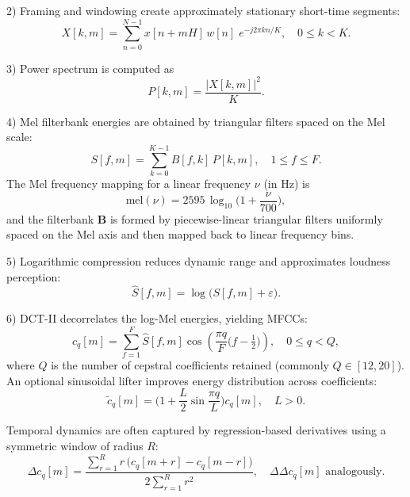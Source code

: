 2) Framing and windowing create approximately stationary short-time segments:
\begin{equation}\label{eq:stft}
X[k,m] = \sum_{n=0}^{N-1} x[n+mH]\, w[n] \; e^{-j 2\pi k n / K}, \quad 0 \le k < K.
\end{equation}

3) Power spectrum is computed as
\begin{equation}\label{eq:power}
P[k,m] = \frac{|X[k,m]|^2}{K}.
\end{equation}

4) Mel filterbank energies are obtained by triangular filters spaced on the Mel scale:
\begin{equation}\label{eq:mel}
S[f,m] = \sum_{k=0}^{K-1} B[f,k] \, P[k,m], \quad 1 \le f \le F.
\end{equation}
The Mel frequency mapping for a linear frequency \(\nu\) (in Hz) is
\begin{equation}\label{eq:mel-scale}
\mathrm{mel}(\nu) = 2595\, \log_{10}\!\bigg(1 + \frac{\nu}{700}\bigg),
\end{equation}
and the filterbank \(\mathbf{B}\) is formed by piecewise-linear triangular filters uniformly spaced on the Mel axis and then mapped back to linear frequency bins.

5) Logarithmic compression reduces dynamic range and approximates loudness perception:
\begin{equation}\label{eq:logmel}
\widehat{S}[f,m] = \log\big(S[f,m] + \varepsilon\big).
\end{equation}

6) DCT-II decorrelates the log-Mel energies, yielding MFCCs:
\begin{equation}\label{eq:dct}
c_q[m] = \sum_{f=1}^{F} \widehat{S}[f,m] \cos\!\left( \frac{\pi q}{F} \Big(f - \tfrac{1}{2}\Big) \right), \quad 0 \le q < Q,
\end{equation}
where \(Q\) is the number of cepstral coefficients retained (commonly \(Q\in[12,20]\)). An optional sinusoidal lifter improves energy distribution across coefficients:
\begin{equation}\label{eq:lifter}
\widetilde{c}_q[m] = \Big(1 + \frac{L}{2} \sin\!\frac{\pi q}{L}\Big) c_q[m], \quad L>0.
\end{equation}

Temporal dynamics are often captured by regression-based derivatives using a symmetric window of radius \(R\):
\begin{equation}\label{eq:delta}
\Delta c_q[m] = \frac{\sum_{r=1}^{R} r\, \big(c_q[m+r] - c_q[m-r]\big)}{2 \sum_{r=1}^{R} r^2}, \quad \Delta\!\Delta c_q[m] \text{ analogously.}
\end{equation}

